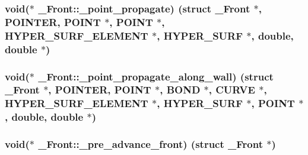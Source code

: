 \subsubsection[{\texorpdfstring{\+\_\+point\+\_\+propagate}{_point_propagate}}]{\setlength{\rightskip}{0pt plus 5cm}void($\ast$ \+\_\+\+Front\+::\+\_\+point\+\_\+propagate) (struct {\bf \+\_\+\+Front} $\ast$, {\bf P\+O\+I\+N\+T\+ER}, {\bf P\+O\+I\+NT} $\ast$, {\bf P\+O\+I\+NT} $\ast$, {\bf H\+Y\+P\+E\+R\+\_\+\+S\+U\+R\+F\+\_\+\+E\+L\+E\+M\+E\+NT} $\ast$, {\bf H\+Y\+P\+E\+R\+\_\+\+S\+U\+RF} $\ast$, double, double $\ast$)}\hypertarget{struct___front_a04e0d1efc088a351a6e1127be2442107}{}\label{struct___front_a04e0d1efc088a351a6e1127be2442107}
\subsubsection[{\texorpdfstring{\+\_\+point\+\_\+propagate\+\_\+along\+\_\+wall}{_point_propagate_along_wall}}]{\setlength{\rightskip}{0pt plus 5cm}void($\ast$ \+\_\+\+Front\+::\+\_\+point\+\_\+propagate\+\_\+along\+\_\+wall) (struct {\bf \+\_\+\+Front} $\ast$, {\bf P\+O\+I\+N\+T\+ER}, {\bf P\+O\+I\+NT} $\ast$, {\bf B\+O\+ND} $\ast$, {\bf C\+U\+R\+VE} $\ast$, {\bf H\+Y\+P\+E\+R\+\_\+\+S\+U\+R\+F\+\_\+\+E\+L\+E\+M\+E\+NT} $\ast$, {\bf H\+Y\+P\+E\+R\+\_\+\+S\+U\+RF} $\ast$, {\bf P\+O\+I\+NT} $\ast$, double, double $\ast$)}\hypertarget{struct___front_a74a6aaee03f914d129320e9a1980100c}{}\label{struct___front_a74a6aaee03f914d129320e9a1980100c}
\subsubsection[{\texorpdfstring{\+\_\+pre\+\_\+advance\+\_\+front}{_pre_advance_front}}]{\setlength{\rightskip}{0pt plus 5cm}void($\ast$ \+\_\+\+Front\+::\+\_\+pre\+\_\+advance\+\_\+front) (struct {\bf \+\_\+\+Front} $\ast$)}\hypertarget{struct___front_aa597d640e991439ea0d7656fc072e164}{}\label{struct___front_aa597d640e991439ea0d7656fc072e164}
